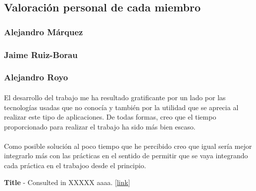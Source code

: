 \documentclass[a4paper]{article}
\begin{document}
	\subsection{Valoración personal de cada miembro}
	
	
		\subsubsection{Alejandro Márquez}
		
			\paragraph{}
		
		\subsubsection{Jaime Ruiz-Borau}
			
			\paragraph{}
		
		\subsubsection{Alejandro Royo}
		
			\paragraph{} El desarrollo del trabajo me ha resultado gratificante por un lado por las tecnologías usadas que no conocía y también por la utilidad que se aprecia al realizar este tipo de aplicaciones. De todas formas, creo que el tiempo proporcionado para realizar el trabajo ha sido más bien escaso.
			
			\paragraph{} Como posible solución al poco tiempo que he percibido creo que igual sería mejor integrarlo más con las prácticas en el sentido de permitir que se vaya integrando cada práctica en el trabajoo desde el principio.
	
\newpage
\begin{thebibliography}{99} 
 \textbf{Title} - Consulted in XXXXX aaaa. [\url{link}]

\end{thebibliography}
\end{document}
